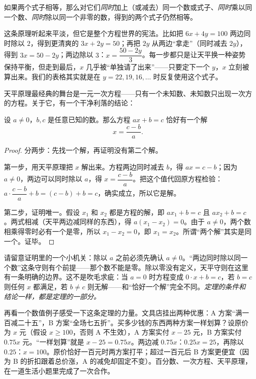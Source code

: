 \begin{dingli}[天平原理]
如果两个式子相等，那么对它们\emph{同时}加上（或减去）同一个数或式子、\emph{同时}乘以同一个数、\emph{同时}除以同一个非零的数，得到的两个式子仍然相等。
\end{dingli}

这条原理听起来平淡，但它是整个方程世界的宪法。比如把 $6x+4y=100$ 两边同时除以 $2$，得到更清爽的 $3x+2y=50$；再把 $2y$ 从两边“拿走”（同时减去 $2y$），得到 $3x=50-2y$；两边除以 $3$：$x=\dfrac{50-2y}{3}$。每一步都只是让天平换一种姿势保持平衡，但走到最后，$x$ 几乎被“单独请了出来”——只要定下一个 $y$，$x$ 立刻被算出来。我们的表格其实就是在 $y=22,19,16,\dots$ 时反复使用这个式子。

天平原理最经典的舞台是一元一次方程——只有一个未知数、未知数只出现一次方的方程。关于它，有一个干净利落的结论：

\begin{dingli}[一元一次方程的解]
设 $a\neq 0$，$b,c$ 是任意已知的数。那么方程 $ax+b=c$ 恰好有一个解
\[
x=\frac{c-b}{a}.
\]
\end{dingli}

\begin{proof}
分两步：先找一个解，再证明没有第二个解。

第一步，用天平原理把 $x$ 解出来。方程两边同时减去 $b$，得 $ax=c-b$；因为 $a\neq0$，两边可以同时除以 $a$，得 $x=\dfrac{c-b}{a}$。把这个值代回原方程检验：$a\cdot\dfrac{c-b}{a}+b=(c-b)+b=c$，确实成立，所以它是解。

第二步，证明唯一。假设 $x_1$ 和 $x_2$ 都是方程的解，即 $ax_1+b=c$ 且 $ax_2+b=c$。两式相减（天平两边减同样的东西），得 $a(x_1-x_2)=0$。由于 $a\neq0$，两个数相乘得零时必有一个是零，所以 $x_1-x_2=0$，即 $x_1=x_2$。所谓“两个解”其实是同一个。证毕。
\end{proof}

请留意证明里的一个小机关：除以 $a$ 之前必须先确认 $a\neq0$。“两边同时除以同一个数”这条守则有个前提——那个数不能是零。除以零没有定义，天平守则在这里有一条明确的边界。这不是吹毛求疵：当 $a=0$ 时方程变成 $0\cdot x+b=c$，若 $b=c$ 则任何 $x$ 都满足，若 $b\neq c$ 则无解——和“恰好一个解”完全不同。\emph{定理的条件和结论一样，都是定理的一部分。}

再看一个数值例子感受一下这条定理的力量。文具店挂出两种优惠：A 方案“满一百减二十五”，B 方案“全场七五折”。买多少钱的东西两种方案一样划算？设原价为 $x$ 元（假设 $x\geq100$，否则 A 不生效），A 方案实付 $x-25$ 元，B 方案实付 $0.75x$ 元。“一样划算”就是 $x-25=0.75x$。两边减 $0.75x$：$0.25x=25$，再除以 $0.25$：$x=100$。原价恰好一百元时两方案打平；超过一百元后 B 方案更便宜（因为 B 的折扣跟着总价涨，A 的减免却固定不变）。百分数、一次方程、天平原理，在一道生活小题里完成了一次合作。

